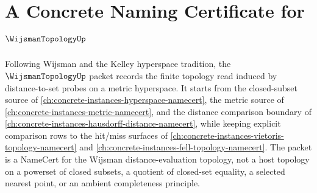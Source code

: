 \chapter{A Concrete Naming Certificate for $\WijsmanTopologyUp$}
\label{ch:concrete-instances-wijsman-topology-namecert}

Following Wijsman and the Kelley hyperspace tradition, the $\WijsmanTopologyUp$ packet records the finite topology read induced by distance-to-set probes on a metric hyperspace. It starts from the closed-subset source of \autoref{ch:concrete-instances-hyperspace-namecert}, the metric source of \autoref{ch:concrete-instances-metric-namecert}, and the distance comparison boundary of \autoref{ch:concrete-instances-hausdorff-distance-namecert}, while keeping explicit comparison rows to the hit/miss surfaces of \autoref{ch:concrete-instances-vietoris-topology-namecert} and \autoref{ch:concrete-instances-fell-topology-namecert}. The packet is a NameCert for the Wijsman distance-evaluation topology, not a host topology on a powerset of closed subsets, a quotient of closed-set equality, a selected nearest point, or an ambient completeness principle.

